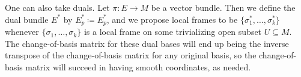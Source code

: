 \documentclass[../notes.tex]{subfiles}
\begin{document}
\begin{example}
	One can also take duals. Let $\pi\colon E\to M$ be a vector bundle. Then we define the dual bundle $E^*$ by $E^*_p\coloneqq E_p^*$, and we propose local frames to be $\{\sigma_1^*,\ldots,\sigma_k^*\}$ whenever $\{\sigma_1,\ldots,\sigma_k\}$ is a local frame on some trivializing open subset $U\subseteq M$. The change-of-basis matrix for these dual bases will end up being the inverse transpose of the change-of-basis matrix for any original basis, so the change-of-basis matrix will succeed in having smooth coordinates, as needed.
\end{example}
\end{document}
